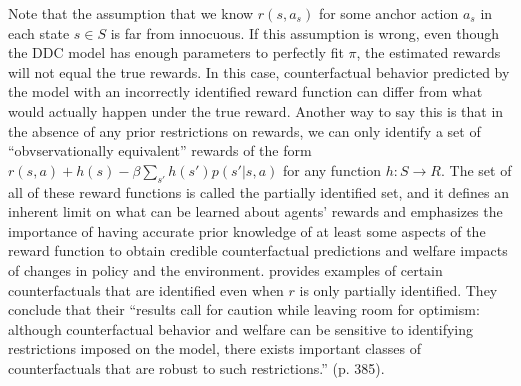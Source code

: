 Note that the assumption that we know $r(s,a_s)$ for some anchor action $a_s$ in each state $s \in S$ is far from
innocuous. If this assumption is wrong, even though the DDC model has enough parameters to perfectly fit $\pi$,
the estimated rewards will not equal the true rewards. In this case, counterfactual behavior predicted by the model
with an incorrectly identified reward function can differ from what would actually happen under the true reward.
Another way to say this is that in the absence of any prior 
restrictions on rewards, we can only
identify a set of ``obvservationally equivalent''  rewards of the form $r(s,a)+h(s)-\beta \sum_{s'} h(s')p(s'|s,a)$ for any function $h: S \to R$. The set of all of these reward functions 
is called the partially identified set, and it defines an inherent limit
on what can be learned about agents' rewards  and emphasizes the importance of having accurate prior knowledge of 
at least some aspects of the reward function 
to obtain credible counterfactual predictions and welfare impacts of changes in policy and the environment. 
\citet{souza:2021} provides examples of certain counterfactuals that are  identified even when $r$ is
only partially identified. They conclude that their ``results call for caution while leaving room for optimism: 
although counterfactual behavior and welfare can be sensitive to identifying restrictions imposed on the model, 
there exists important classes of counterfactuals that are robust to such restrictions.'' (p. 385).



